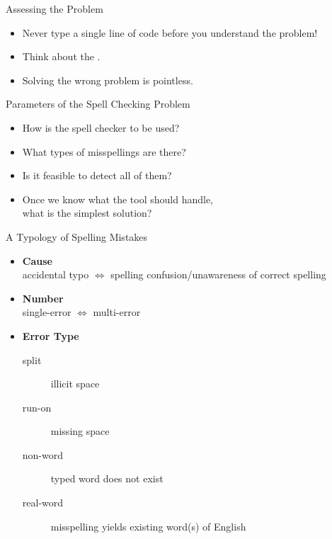 \documentclass[professionalfonts, xcolor={usenames,svgnames,x11names,table}]{beamer}
\begin{document}
\begin{frame}{Assessing the Problem}
    \begin{itemize}
        \item Never type a single line of code before you understand the problem!
        \item Think about the .
        \item Solving the wrong problem is pointless.
    \end{itemize}
    \pause
    \begin{block}{Parameters of the Spell Checking Problem}
        \begin{itemize}
            \item How is the spell checker to be used?\\
            \item What types of misspellings are there?
            \item Is it feasible to detect all of them?
            \item Once we know what the tool should handle,\\
                what is the simplest solution?
        \end{itemize}
    \end{block}
\end{frame}

\begin{frame}{A Typology of Spelling Mistakes}
    \begin{itemize}
        \item \textbf{Cause}\\
            accidental typo $\Leftrightarrow$ spelling confusion\slash unawareness of correct spelling
        \item \textbf{Number}\\
            single-error $\Leftrightarrow$ multi-error
        \item \textbf{Error Type}
            \begin{description}
                \item[split] illicit space\\
                \item[run-on] missing space\\
                \item[non-word] typed word does not exist\\ 
                \item[real-word] misspelling yields existing word(s) of English\\
            \end{description}
    \end{itemize}
\end{frame}
\end{document}
